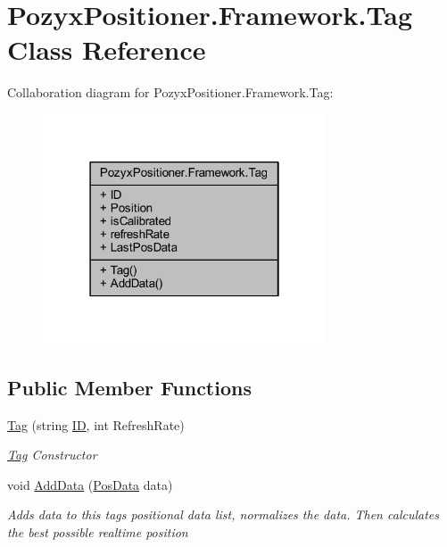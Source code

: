 \hypertarget{class_pozyx_positioner_1_1_framework_1_1_tag}{}\section{Pozyx\+Positioner.\+Framework.\+Tag Class Reference}
\label{class_pozyx_positioner_1_1_framework_1_1_tag}


Collaboration diagram for Pozyx\+Positioner.\+Framework.\+Tag\+:\nopagebreak
\begin{figure}[H]
\begin{center}
\leavevmode
\includegraphics[width=238pt]{class_pozyx_positioner_1_1_framework_1_1_tag__coll__graph}
\end{center}
\end{figure}
\subsection*{Public Member Functions}
\begin{DoxyCompactItemize}
\item 
\hyperlink{class_pozyx_positioner_1_1_framework_1_1_tag_a9b58a1a5756bf3c8cda1e2afd32276b2}{Tag} (string \hyperlink{class_pozyx_positioner_1_1_framework_1_1_tag_a0d75eeca4dea7088e2b4a60230c13012}{ID}, int Refresh\+Rate)
\begin{DoxyCompactList}\small\item\em \hyperlink{class_pozyx_positioner_1_1_framework_1_1_tag}{Tag} Constructor \end{DoxyCompactList}\item 
void \hyperlink{class_pozyx_positioner_1_1_framework_1_1_tag_ac2741e137c420ad71f64ee2d3d5fefe8}{Add\+Data} (\hyperlink{struct_pozyx_positioner_1_1_framework_1_1_pos_data}{Pos\+Data} data)
\begin{DoxyCompactList}\small\item\em Adds data to this tag\textquotesingle{}s positional data list, normalizes the data. Then calculates the best possible realtime position \end{DoxyCompactList}\end{DoxyCompactItemize}
